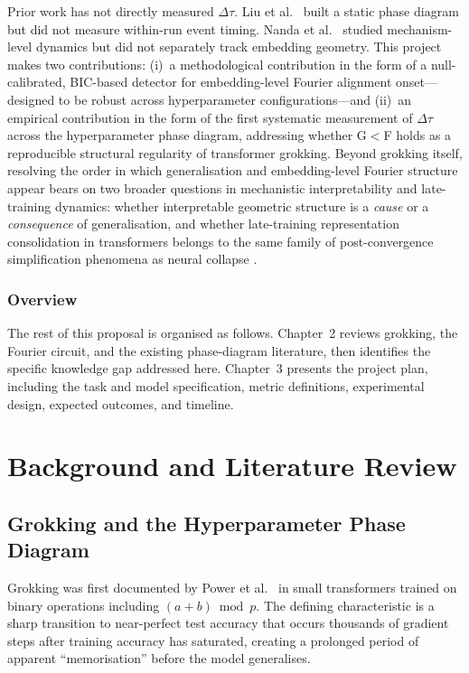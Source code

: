\documentclass[12pt,openany,a4paper]{book}
\newcommand{\Dtau}{\Delta\tau}
\begin{document}
Prior work has not directly measured $\Dtau$.
Liu et al.\ \cite{liu2022towards} built a static phase diagram but did
not measure within-run event timing.
Nanda et al.\ \cite{nanda2023progress} studied mechanism-level dynamics
but did not separately track embedding geometry.
This project makes two contributions: (i)~a methodological contribution
in the form of a null-calibrated, BIC-based detector for embedding-level
Fourier alignment onset---designed to be robust across hyperparameter
configurations---and (ii)~an empirical contribution in the form of
the first systematic measurement of $\Dtau$ across the hyperparameter
phase diagram, addressing whether G$<$F holds as a reproducible
structural regularity of transformer grokking.
Beyond grokking itself, resolving the order in which generalisation
and embedding-level Fourier structure appear bears on two broader
questions in mechanistic interpretability and late-training dynamics:
whether interpretable geometric structure is a \emph{cause} or a
\emph{consequence} of generalisation, and whether late-training
representation consolidation in transformers belongs to the same
family of post-convergence simplification phenomena as neural collapse
\cite{papyan2020prevalence}.

\subsection{Overview}

The rest of this proposal is organised as follows.
Chapter~2 reviews grokking, the Fourier circuit, and the existing phase-diagram literature, then identifies the specific knowledge gap addressed here.
Chapter~3 presents the project plan, including the task and model specification, metric definitions, experimental design, expected outcomes, and timeline.

\chapter{Background and Literature Review}

\section{Grokking and the Hyperparameter Phase Diagram}

Grokking was first documented by Power et al.\ \cite{power2022grokking}
in small transformers trained on binary operations including
$(a+b)\bmod p$.
The defining characteristic is a sharp transition to near-perfect test
accuracy that occurs thousands of gradient steps after training
accuracy has saturated, creating a prolonged period of apparent
``memorisation'' before the model generalises.
\end{document}
